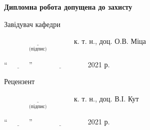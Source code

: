 \vskip4cm

\textbf{Дипломна робота допущена до захисту}

\vskip0.5cm
Завідувач кафедри

$\underset{\text{(підпис)}}{\underline{\hspace{4cm}}}$ к. т. н., доц. О.В. Міца
\bigskip

`` $\underline{\hspace{1cm}}$ '' $\underline{\hspace{3cm}}$  2021 р. 


\vskip1.5cm
Рецензент

$\underset{\text{(підпис)}}{\underline{\hspace{4cm}}}$ к. т. н., доц. В.І. Кут
\bigskip

`` $\underline{\hspace{1cm}}$ '' $\underline{\hspace{3cm}}$  2021 р. 
\newpage
